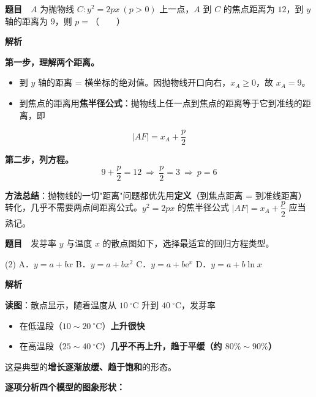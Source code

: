 \textbf{题目}　$A$ 为抛物线 $C:y^{2}=2px\ (p>0)$ 上一点，$A$ 到 $C$ 的焦点距离为 $12$，到 $y$ 轴的距离为 $9$，则 $p=$（　　）

\textbf{解析}

\textbf{第一步，理解两个距离。}

\begin{itemize}
\item 到 $y$ 轴的距离 = 横坐标的绝对值。因抛物线开口向右，$x_A\ge0$，故 $x_A=9$。
\item 到焦点的距离用\textbf{焦半径公式}：抛物线上任一点到焦点的距离等于它到准线的距离，即
\end{itemize}
\[|AF|=x_A+\frac p2\]

\textbf{第二步，列方程。}
\[9+\frac p2=12\ \Longrightarrow\ \frac p2=3\ \Longrightarrow\ p=6\]


\begin{gktip}
\textbf{方法总结}：抛物线的一切"距离"问题都优先用\textbf{定义}（到焦点距离 = 到准线距离）转化，几乎不需要两点间距离公式。$y^2=2px$ 的焦半径公式 $|AF|=x_A+\dfrac p2$ 应当熟记。
\end{gktip}

\par\medskip


\textbf{题目}　发芽率 $y$ 与温度 $x$ 的散点图如下，选择最适宜的回归方程类型。

\begin{center}\end{center}

\begin{gkopts}(2)
\task A．$y=a+bx$
\task B．$y=a+bx^{2}$
\task C．$y=a+b\mathrm e^{x}$
\task D．$y=a+b\ln x$
\end{gkopts}

\textbf{解析}

\textbf{读图}：散点显示，随着温度从 $10\ ^\circ\mathrm C$ 升到 $40\ ^\circ\mathrm C$，发芽率
\begin{itemize}
\item 在低温段（$10\sim20\ ^\circ\mathrm C$）\textbf{上升很快}
\item 在高温段（$25\sim40\ ^\circ\mathrm C$）\textbf{几乎不再上升，趋于平缓（约 $80\%\sim90\%$）}
\end{itemize}

这是典型的\textbf{增长逐渐放缓、趋于饱和}的形态。

\textbf{逐项分析四个模型的图象形状：}

